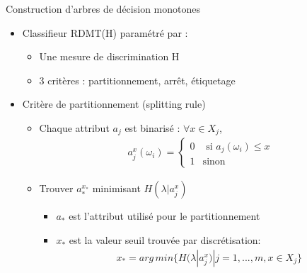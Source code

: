 \documentclass[usenames,dvipsnames]{beamer}
\newcommand{\beamcite}[1]{\hfill {\footnotesize \textcite{#1}}}
\begin{document}
\begin{frame}{Construction d'arbres de décision monotones \beamcite{marsala-rank}}
    \begin{itemize}
        \item Classifieur RDMT(H) paramétré par : 
            \begin{itemize}
                \item Une mesure de discrimination H
                \item 3 critères : partitionnement, arrêt, étiquetage
            \end{itemize}
        \item Critère de partitionnement (splitting rule)
            \begin{itemize}
                \item Chaque attribut $a_j$ est binarisé : $\forall x \in X_j$,
                    \begin{equation*}
                    \begin{array}{cl}
                        a^x_j(\omega_i) = \begin{cases}{0} &\text{ si } a_j(\omega_i) \leq x\\
                          {1} &\text{sinon}\end{cases}
                     \end{array}
                     \end{equation*}
                \item Trouver $a^{x_*}_*$ minimisant $H(\lambda|a^x_j)$
                    \begin{itemize}
                        \item $a_*$ est l'attribut utilisé pour le partitionnement
                        \item $x_*$ est la valeur seuil trouvée par discrétisation: 
                            \begin{equation*}
                            \begin{array}{cl}
                                x_* = arg\,min \{H(\lambda|a^x_j) | j=1,...,m, x \in X_j\}
                            \end{array}
                            \end{equation*}
                    \end{itemize}
            \end{itemize}
    \end{itemize}
\end{frame}
\end{document}
